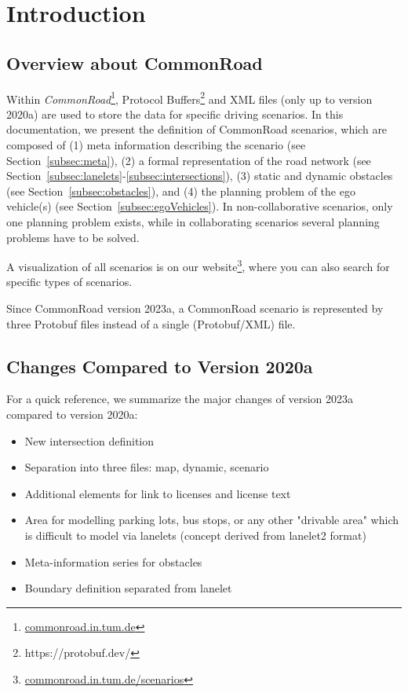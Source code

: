 \section{Introduction}
\label{sec:introduction}
\subsection{Overview about CommonRoad}
Within \textit{CommonRoad}\cite{Althoff2017a}\footnote{\href{https://commonroad.in.tum.de}{commonroad.in.tum.de}}, Protocol Buffers\footnote{https://protobuf.dev/} and XML files (only up to version 2020a) are used to store the data for specific driving scenarios. 
In this documentation, we present the definition of CommonRoad scenarios, which are composed of (1) meta information describing the scenario (see Section~\ref{subsec:meta}), (2) a formal representation of the road network (see Section~\ref{subsec:lanelets}-\ref{subsec:intersections}), (3) static and dynamic obstacles (see Section~\ref{subsec:obstacles}), and (4) the planning problem of the ego vehicle(s) (see Section~\ref{subsec:egoVehicles}). 
In non-collaborative scenarios, only one planning problem exists, while in collaborating scenarios several planning problems have to be solved.

A visualization of all scenarios is on our website\footnote{\href{https://commonroad.in.tum.de/scenarios/}{commonroad.in.tum.de/scenarios}}, where you can also search for specific types of scenarios.

Since CommonRoad version 2023a, a CommonRoad scenario is represented by three Protobuf files instead of a  single (Protobuf/XML) file.


\subsection{Changes Compared to Version 2020a}

For a quick reference, we summarize the major changes of version 2023a compared to version 2020a:
\begin{itemize}
\item New intersection definition
\item Separation into three files: map, dynamic, scenario 
\item Additional elements for link to licenses and license text
\item Area for modelling parking lots, bus stops, or any other "drivable area" which is difficult to model via lanelets (concept derived from lanelet2 format)
\item Meta-information series for obstacles
\item Boundary definition separated from lanelet 
\end{itemize}


